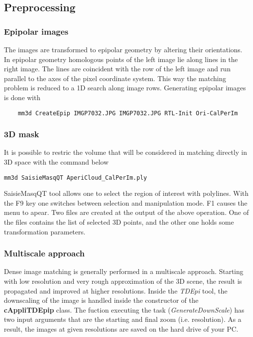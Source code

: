                                                      
\subsection{Preprocessing}\label{subsection:preproc}

\subsubsection{Epipolar images} The images are transformed to epipolar geometry by altering their orientations. In epipolar geometry homologous points of the left image lie along lines in the right image. The lines are coincident with the row of the left image and run parallel to the axes of the pixel coordinate system. This way the matching problem is reduced to a 1D search along image rows. Generating epipolar images is done with
\begin{lstlisting}
	mm3d CreateEpip IMGP7032.JPG IMGP7032.JPG RTL-Init Ori-CalPerIm 
\end{lstlisting}

\subsubsection{3D mask}
It is possible to restric the volume that will be considered in matching directly in 3D space with the command below
\begin{lstlisting}
mm3d SaisieMasqQT AperiCloud_CalPerIm.ply 
\end{lstlisting}

SaisieMasqQT tool allows one to select the region of interest with polylines. With the F9 key one switches between selection and manipulation mode. F1 causes the menu to apear. Two files are created at the output of the above operation. One of the files contains the list of selected 3D points, and the other one holds some transformation parameters.

\subsubsection{Multiscale approach}
Dense image matching is generally performed in a multiscale approach. Starting with low resolution and very rough approximation of the 3D scene, the result is propagated and improved at higher resolutions. Inside the \emph{TDEpi} tool, the downscaling of the image is handled inside the constructor of the \textbf{cAppliTDEpip} class. The fuction executing the task (\emph{GenerateDownScale}) has two input arguments that are the starting and final zoom (i.e. resolution). As a result, the images at given resolutions are saved on the hard drive of your PC.

